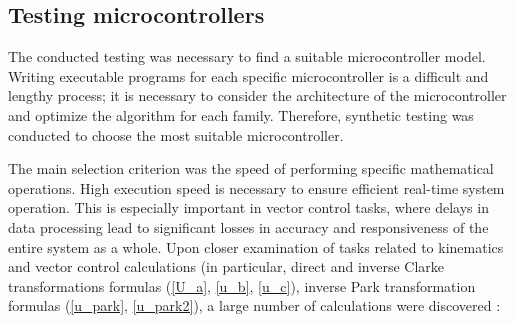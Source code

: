 \subsection{Testing microcontrollers}

The conducted testing was necessary to find a suitable microcontroller model. Writing executable programs for each specific microcontroller is a difficult and lengthy process; it is necessary to consider the architecture of the microcontroller and optimize the algorithm for each family. Therefore, synthetic testing was conducted to choose the most suitable microcontroller.

The main selection criterion was the speed of performing specific mathematical operations. High execution speed is necessary to ensure efficient real-time system operation. This is especially important in vector control tasks, where delays in data processing lead to significant losses in accuracy and responsiveness of the entire system as a whole. Upon closer examination of tasks related to kinematics and vector control calculations (in particular, direct and inverse Clarke transformations formulas (\ref{U_a}, \ref{u_b}, \ref{u_c}), inverse Park transformation formulas (\ref{u_park}, \ref{u_park2}), a large number of calculations were discovered \citep{5899203}:
